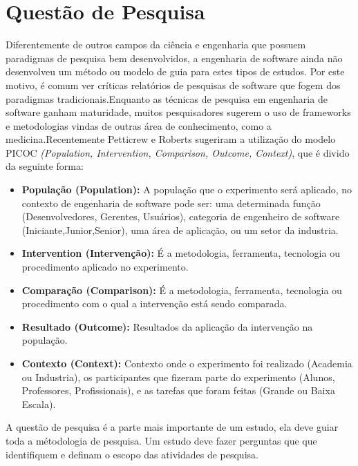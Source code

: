 \section{Questão de Pesquisa}

Diferentemente de outros campos da ciência e engenharia que possuem paradigmas de
pesquisa bem desenvolvidos, a engenharia de software ainda não desenvolveu um
método ou modelo de guia para estes tipos de estudos. Por este motivo, é
comum ver críticas relatórios de pesquisas de software que fogem dos paradigmas
tradicionais\cite{shaw}.Enquanto as técnicas de pesquisa em engenharia de software
ganham maturidade, muitos pesquisadores sugerem o uso de frameworks e metodologias
vindas de outras área de conhecimento, como a medicina\cite{guidelines}.Recentemente
Petticrew e Roberts sugeriram a utilização do modelo PICOC \textit{(Population,
Intervention, Comparison, Outcome, Context)}, que é divido da seguinte forma\cite{petticrew}:

\begin{itemize}
    \item \textbf{População (Population):} A população que o experimento será
        aplicado, no contexto de engenharia de software pode ser: uma determinada
        função (Desenvolvedores, Gerentes, Usuários), categoria de engenheiro de
        software (Iniciante,Junior,Senior), uma área de aplicação, ou um setor
        da industria.
    \item \textbf{Intervention (Intervenção):} É a metodologia, ferramenta,
        tecnologia ou procedimento aplicado no experimento.
    \item \textbf{Comparação (Comparison):} É a metodologia, ferramenta,
        tecnologia ou procedimento com o qual a intervenção está sendo comparada.
    \item \textbf{Resultado  (Outcome):} Resultados da aplicação da intervenção na
        população.
    \item \textbf{Contexto (Context):} Contexto onde o experimento foi realizado
        (Academia ou Industria), os participantes que fizeram parte do experimento
        (Alunos, Professores, Profissionais), e as tarefas que foram feitas
        (Grande ou Baixa Escala).
\end{itemize}

A questão de pesquisa é a parte mais importante de um estudo, ela deve guiar toda
a métodologia de pesquisa. Um estudo deve fazer perguntas que que identifiquem e
definam o escopo das atividades de pesquisa\cite{guidelines}.

